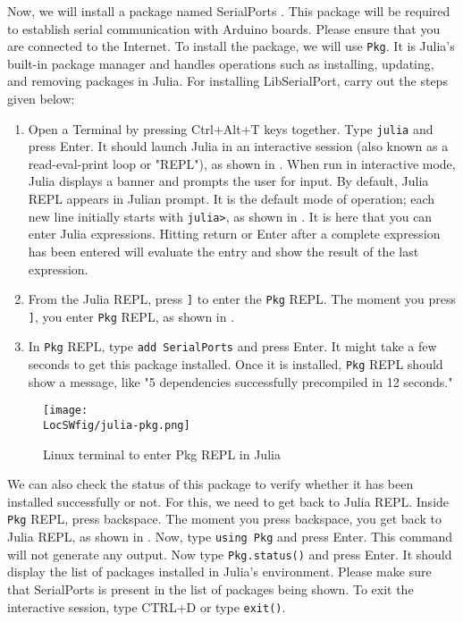 Now, we will install a package named SerialPorts \cite{julia-serial-ports}. This package will be required to
establish serial communication with Arduino boards. Please ensure that you
are connected to the Internet. To install the package,
we will use {\tt Pkg}. It is Julia's built-in package manager and
handles operations such as installing, updating, and removing packages in Julia.
For installing LibSerialPort, carry out the steps given below:
\begin{enumerate}
      \item Open a Terminal by pressing Ctrl+Alt+T keys together. Type {\tt julia} and press Enter.
            It should launch Julia in an interactive session (also known as a read-eval-print loop or "REPL"), as shown
            in . When run in interactive mode, Julia displays a banner and
            prompts the user for input. By default, Julia REPL appears in Julian prompt. It is the default mode of
            operation; each new line initially starts with {\tt julia>}, as
            shown in . It is here that you can enter Julia expressions.
            Hitting return or Enter after a complete expression has been entered will evaluate
            the entry and show the result of the last expression.
      \item From the Julia REPL, press {\tt ]} to enter the {\tt Pkg} REPL. The moment you press
                  {\tt ]}, you enter {\tt Pkg} REPL, as shown in .
      \item In {\tt Pkg} REPL, type {\tt add SerialPorts} and press Enter. It might take a few seconds
            to get this package installed. Once it is installed, {\tt Pkg} REPL should show a message,
            like "5 dependencies successfully precompiled in 12 seconds."
\end{enumerate}

\begin{figure}
      \centering
      \texttt{[image: \\LocSWfig/julia-pkg.png]}
      \caption{Linux terminal to enter Pkg REPL in Julia}
      \label{julia-pkg}
\end{figure}

We can also check the status of this package to verify whether it has been installed
successfully or not. For this, we need to get back to Julia REPL. Inside {\tt Pkg}
REPL, press backspace. The moment you press backspace, you get back to Julia REPL, as shown in
. Now, type {\tt using Pkg} and press Enter. This command will not
generate any output. Now type {\tt Pkg.status()} and press Enter. It should display the
list of packages installed in Julia's environment. Please make sure that SerialPorts
is present in the list of packages being shown. To exit the interactive session, type CTRL+D or type {\tt exit()}.


